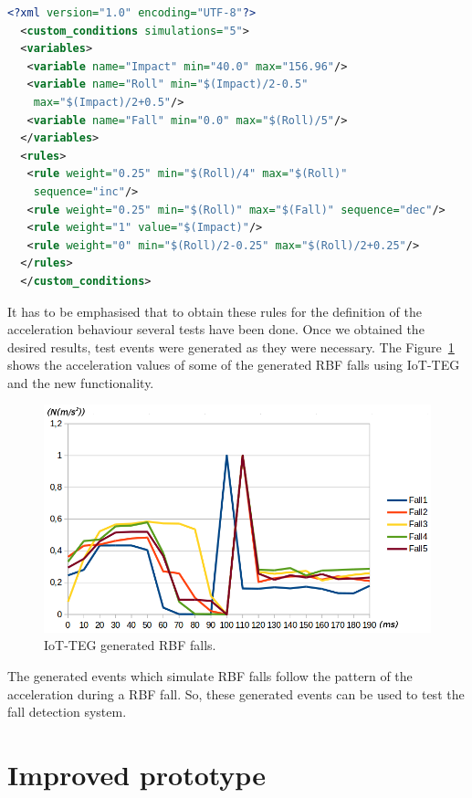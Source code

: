 \documentclass[review]{elsarticle}
\begin{document}
\begin{lstlisting}[basicstyle=\ttfamily\footnotesize,language=XML,caption={Rules to define a RBF fall},label=RBFFallRules]
  <?xml version="1.0" encoding="UTF-8"?>
  <custom_conditions simulations="5">
  <variables>
   <variable name="Impact" min="40.0" max="156.96"/>
   <variable name="Roll" min="$(Impact)/2-0.5" 
    max="$(Impact)/2+0.5"/>
   <variable name="Fall" min="0.0" max="$(Roll)/5"/>
  </variables>
  <rules>
   <rule weight="0.25" min="$(Roll)/4" max="$(Roll)" 
    sequence="inc"/>
   <rule weight="0.25" min="$(Roll)" max="$(Fall)" sequence="dec"/>
   <rule weight="1" value="$(Impact)"/>
   <rule weight="0" min="$(Roll)/2-0.25" max="$(Roll)/2+0.25"/>
  </rules>
  </custom_conditions>
\end{lstlisting}

It has to be emphasised that to obtain these rules for the definition
of the acceleration behaviour several tests
have been done. Once we obtained the desired results, test events were generated as they were necessary. The 
Figure~\ref{fig:IoTTEGRBFGeneratedEvents} shows the acceleration values of some of the generated RBF falls using
IoT-TEG and the new functionality.

\begin{figure}[!ht]
  \centering
  \includegraphics[scale=0.3]{img/IoTTEGRBFGeneratedEvents}
  \caption[IoT-TEG generated RBF falls]{IoT-TEG generated RBF falls.}
  \label{fig:IoTTEGRBFGeneratedEvents}
\end{figure}

The generated events which simulate RBF falls follow the pattern of the acceleration during a RBF fall.
So, these generated events can be used to test the fall detection system.

\section{Improved prototype}
\label{sec:improvedprototype}
\end{document}
